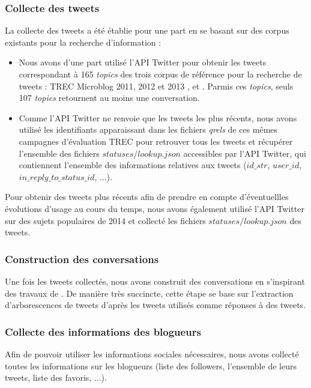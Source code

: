 \documentclass{article-hermes}
\begin{document}
\subsubsection{Collecte des tweets}

\par La collecte des tweets a été établie pour une part en se basant sur des corpus existants pour la recherche d'information :
\begin{itemize}
\item Nous avons d'une part utilisé l'API Twitter pour obtenir les tweets correspondant à 165 {\it topics} des trois corpus de référence pour la recherche de tweets : TREC Microblog 2011, 2012 et 2013 \cite{trec2011}, \cite{trec2012} et \cite{trec2013}. Parmis ces {\it topics}, seuls 107 {\it topics} retournent au moins une conversation.
\item Comme l'API Twitter 
ne renvoie que les tweets les plus récents, nous avons utilisé les identifiants apparaissant dans les fichiers {\it qrels} de ces mêmes campagnes d'évaluation TREC pour retrouver tous les tweets et récupérer l'ensemble des fichiers $statuses/lookup.json$ accessibles par l'API Twitter, qui contiennent l'ensemble des informations relatives aux tweets ($id\_str$, $user\_id$, $in\_ reply\_to\_status\_id$, ...).
\end{itemize} 
\par Pour obtenir des tweets plus récents afin de prendre en compte d'éventuellles évolutions d'usage au cours du temps, nous avons également utilisé l'API Twitter sur des sujets populaires de 2014 et collecté les fichiers $statuses/lookup.json$ des tweets.

\subsubsection{Construction des conversations}
\par Une fois les tweets collectés, nous avons construit des conversations en s'inspirant des travaux de \cite{cogan}. De manière très succincte, cette étape se base sur l'extraction d'arborescences de tweets d'après les tweets utilisés comme réponses à des tweets.

\subsubsection{Collecte des informations des blogueurs} 
\par Afin de pouvoir utiliser les informations sociales nécessaires, nous avons collecté toutes les informations sur les blogueurs (liste des followers, l'ensemble de leurs tweets, liste des favoris, ...).
\end{document}
